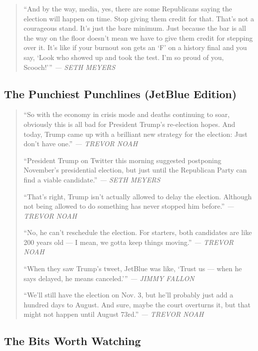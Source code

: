 \begin{quote}
``And by the way, media, yes, there are some Republicans saying the
election will happen on time. Stop giving them credit for that. That's
not a courageous stand. It's just the bare minimum. Just because the bar
is all the way on the floor doesn't mean we have to give them credit for
stepping over it. It's like if your burnout son gets an `F' on a history
final and you say, `Look who showed up and took the test. I'm so proud
of you, Scooch!''' \emph{--- SETH MEYERS}
\end{quote}

\hypertarget{the-punchiest-punchlines-jetblue-edition}{%
\subsection{The Punchiest Punchlines (JetBlue
Edition)}\label{the-punchiest-punchlines-jetblue-edition}}

\begin{quote}
``So with the economy in crisis mode and deaths continuing to soar,
obviously this is all bad for President Trump's re-election hopes. And
today, Trump came up with a brilliant new strategy for the election:
Just don't have one.'' \emph{--- TREVOR NOAH}

``President Trump on Twitter this morning suggested postponing
November's presidential election, but just until the Republican Party
can find a viable candidate.'' \emph{--- SETH MEYERS}

``That's right, Trump isn't actually allowed to delay the election.
Although not being allowed to do something has never stopped him
before.'' \emph{--- TREVOR NOAH}

``No, he can't reschedule the election. For starters, both candidates
are like 200 years old --- I mean, we gotta keep things moving.''
\emph{--- TREVOR NOAH}

``When they saw Trump's tweet, JetBlue was like, `Trust us --- when he
says delayed, he means canceled.''' \emph{--- JIMMY FALLON}

``We'll still have the election on Nov. 3, but he'll probably just add a
hundred days to August. And sure, maybe the court overturns it, but that
might not happen until August 73rd.'' \emph{--- TREVOR NOAH}
\end{quote}

\hypertarget{the-bits-worth-watching}{%
\subsection{The Bits Worth Watching}\label{the-bits-worth-watching}}

